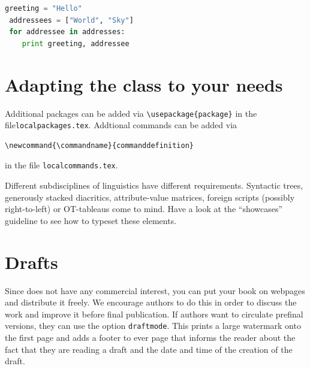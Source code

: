 \begin{lstlisting}[language=Python, stringstyle=\color{blue}]
 greeting = "Hello"
 addressees = ["World", "Sky"]
 for addressee in addresses:
    print greeting, addressee
\end{lstlisting}

\section{Adapting the class to your needs}

Additional packages can be added via \verb+\usepackage{package}+ in the file\linebreak \verb+localpackages.tex+.
Addtional commands can be added via \begin{verbatim}\newcommand{\commandname}{commanddefinition}\end{verbatim} in the file \verb+localcommands.tex+. 


Different subdisciplines of linguistics have different requirements. Syntactic trees, generously stacked diacritics, attribute-value matrices, foreign scripts (possibly right-to-left) or OT-tableaus come to mind. Have a look at the ``showcases'' guideline to see how to typeset these elements.


 
   
\section{Drafts}

Since \lsp does not have any commercial interest, you can put your book on webpages and distribute it
freely. We encourage authors to do this in order to discuss the work and improve it before final
publication. If authors want to circulate prefinal versions, they can use the option
\texttt{draftmode}. This prints a large watermark onto the first page and adds a footer to ever page
that informs the reader about the fact that they are reading a draft and the date and time of the
creation of the draft.
  
